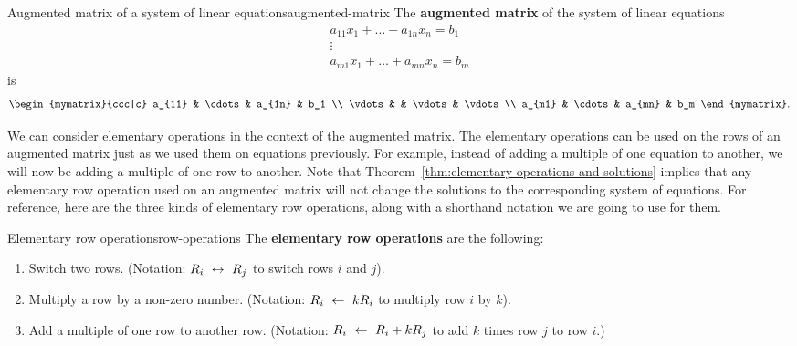 \begin{definition}{Augmented matrix of a system of linear equations}{augmented-matrix}
  The \textbf{augmented matrix}%
   of the system of linear equations
  \begin{equation*}
    \begin{array}{c}
      a_{11}x_1 + \ldots + a_{1n}x_n = b_1 \\
      \vdots \\
      a_{m1}x_1 + \ldots + a_{mn}x_n = b_m
    \end{array}
  \end{equation*}
  is
  \begin{equation*}
    \begin{mymatrix}{ccc|c}
      a_{11} & \cdots & a_{1n} &  b_1 \\
      \vdots &  & \vdots &  \vdots \\
      a_{m1} & \cdots & a_{mn} &  b_m
    \end{mymatrix}.
  \end{equation*}
\end{definition}

We can consider elementary operations in the context of the augmented
matrix. The elementary operations can be used on the rows of an
augmented matrix just as we used them on equations previously. For
example, instead of adding a multiple of one equation to another, we
will now be adding a multiple of one row to another. Note that
Theorem~\ref{thm:elementary-operations-and-solutions} implies that any
elementary row operation used on an augmented matrix will not change
the solutions to the corresponding system of equations. For reference,
here are the three kinds of elementary row operations, along with a
shorthand notation we are going to use for them.

\begin{definition}{Elementary row operations}{row-operations}
  The \textbf{elementary row operations}%
   are the
  following:
  \begin{enumerate}
  \item Switch two rows. (Notation: $R_i~\leftrightarrow~ R_j$ to switch
    rows $i$ and $j$).
  \item Multiply a row by a non-zero number.  (Notation: $R_i~\leftarrow~
    kR_i$ to multiply row $i$ by $k$).
  \item Add a multiple of one row to another row. (Notation:
    $R_i~\leftarrow~ R_i+kR_j$ to add $k$ times row $j$ to row $i$.)
  \end{enumerate}
\end{definition}

